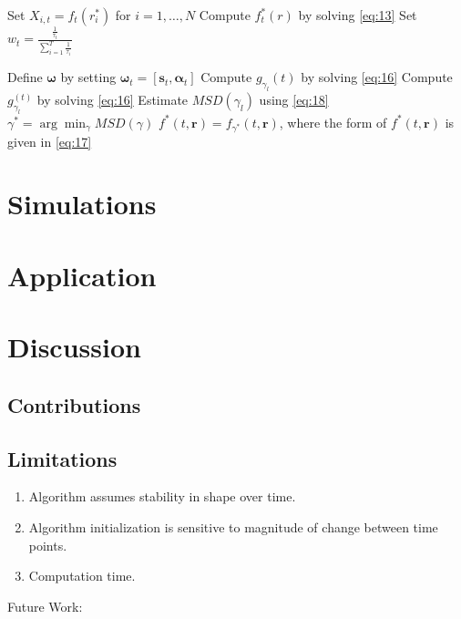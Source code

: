 \documentclass[11pt,reqno]{article}
\theoremstyle{definition}
\begin{document}
\begin{algorithm}
 {
  Set $X_{i, t} = f_t(r_{i}^*)$ for $i = 1, \dots, N$\;
  Compute $f_t^*(r)$ by solving \eqref{eq:13}\;
  Set $w_t = \frac{\frac{1}{\tau_t}}{\sum_{i=1}^{T}\frac{1}{\tau_i}}$\;
}

  Define $\boldsymbol{\omega}$ by setting $\boldsymbol{\omega}_t = \left[\boldsymbol{s}_t, \boldsymbol{\alpha}_t\right]$\;
   {
    Compute $g_{\gamma_l}(t)$ by solving \eqref{eq:16}\;
     {
      Compute $g_{\gamma_l}^{(t)}$ by solving \eqref{eq:16}\;
    }
    Estimate $MSD(\gamma_l)$ using \eqref{eq:18}\;
  }
  $\gamma^* = \arg\min_{\gamma}MSD(\gamma)$\;
  $f^*(t, \boldsymbol{r}) = f_{\gamma^*}(t, \boldsymbol{r})$, where the form of $f^*(t, \boldsymbol{r})$ is given in \eqref{eq:17}
\end{algorithm}

\section{Simulations}

\section{Application}

\section{Discussion}

\subsection*{Contributions}

\subsection*{Limitations}

\begin{enumerate}
  \item Algorithm assumes stability in shape over time.
  \item Algorithm initialization is sensitive to magnitude of change between time points.
  \item Computation time.
\end{enumerate}

Future Work:

\nocite{*}
%
%
\printbibliography
\end{document}
